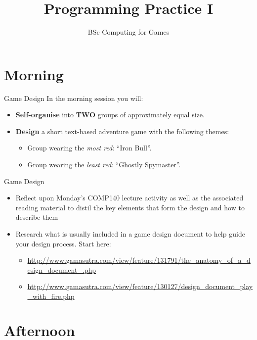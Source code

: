 \documentclass[xcolor={dvipsnames}]{beamer}\usepackage{etoolbox}\newtoggle{printable}\togglefalse{printable}
\begin{document}
\title{Programming Practice I}   
\subtitle{BSc Computing for Games}

\frame{\titlepage} 

\part{Morning}
\frame{\partpage}

\begin{frame}{Game Design}
	In the morning session you will:
	
	\begin{itemize}
		\item \textbf{Self-organise} into \textbf{TWO} groups of approximately equal size.
		\item \textbf{Design} a short text-based adventure game with the following themes:
		\begin{itemize}
			\item Group wearing the \textit{most red}: ``Iron Bull''.
			\item Group wearing the \textit{least red}: ``Ghostly Spymaster''.
		\end{itemize}
	\end{itemize}
\end{frame}

\begin{frame}{Game Design}
	\begin{itemize}
		\item Reflect upon Monday’s COMP140 lecture activity as well as the associated reading material 
		to distil the key elements that form the design and how to describe them
		\item Research what is usually included in a game design document to help guide your design 
		process. Start here:
		\begin{itemize}
			\item \url{http://www.gamasutra.com/view/feature/131791/the_anatomy_of_a_design_document_.php}
			\item \url{http://www.gamasutra.com/view/feature/130127/design_document_play_with_fire.php}
		\end{itemize}
	\end{itemize}
\end{frame}

\part{Afternoon}
\frame{\partpage}
\end{document}
